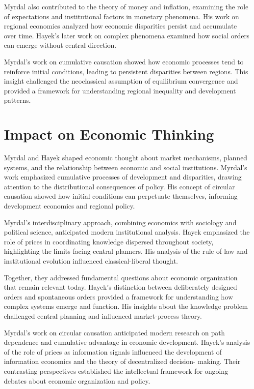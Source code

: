 Myrdal also contributed to the theory of money and inflation, examining the role of expectations
and institutional factors in monetary phenomena. His work on regional economics analyzed how
economic disparities persist and accumulate over time. Hayek's later work on complex phenomena
examined how social orders can emerge without central direction.

Myrdal's work on cumulative causation showed how economic processes tend to reinforce initial
conditions, leading to persistent disparities between regions. This insight challenged the
neoclassical assumption of equilibrium convergence and provided a framework for understanding
regional inequality and development patterns.

\section{Impact on Economic Thinking}
Myrdal and Hayek shaped economic thought about market mechanisms, planned systems, and the
relationship between economic and social institutions. Myrdal's work emphasized cumulative
processes of development and disparities, drawing attention to the distributional consequences of
policy. His concept of circular causation showed how initial conditions can perpetuate themselves,
informing development economics and regional policy.

Myrdal's interdisciplinary approach, combining economics with sociology and political science,
anticipated modern institutional analysis. Hayek emphasized the role of prices in coordinating
knowledge dispersed throughout society, highlighting the limits facing central planners. His
analysis of the rule of law and institutional evolution influenced classical-liberal thought.

Together, they addressed fundamental questions about economic organization that remain relevant
today. Hayek's distinction between deliberately designed orders and spontaneous orders provided
a framework for understanding how complex systems emerge and function. His insights about the
knowledge problem challenged central planning and influenced market-process theory.

Myrdal's work on circular causation anticipated modern research on path dependence and cumulative
advantage in economic development. Hayek's analysis of the role of prices as information signals
influenced the development of information economics and the theory of decentralized decision-
making. Their contrasting perspectives established the intellectual framework for ongoing debates
about economic organization and policy.

